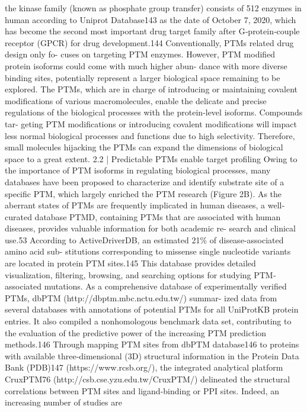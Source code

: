 the kinase family (known as phosphate group transfer) consists of 512 enzymes in human according to Uniprot
Database143 as the date of October 7, 2020, which has become the second most important drug target family after
G‐protein‐couple receptor (GPCR) for drug development.144 Conventionally, PTMs related drug design only fo-
cuses on targeting PTM enzymes. However, PTM modified protein isoforms could come with much higher abun-
dance with more diverse binding sites, potentially represent a larger biological space remaining to be explored. The
PTMs, which are in charge of introducing or maintaining covalent modifications of various macromolecules, enable
the delicate and precise regulations of the biological processes with the protein‐level isoforms. Compounds tar-
geting PTM modifications or introducing covalent modifications will impact less normal biological processes and
functions due to high selectivity. Therefore, small molecules hijacking the PTMs can expand the dimensions of
biological space to a great extent.
2.2
|
Predictable PTMs enable target profiling
Owing to the importance of PTM isoforms in regulating biological processes, many databases have been proposed
to characterize and identify substrate site of a specific PTM, which largely enriched the PTM research (Figure 2B).
As the aberrant states of PTMs are frequently implicated in human diseases, a well‐curated database PTMD,
containing PTMs that are associated with human diseases, provides valuable information for both academic re-
search and clinical use.53 According to ActiveDriverDB, an estimated 21\% of disease‐associated amino acid sub-
stitutions corresponding to missense single nucleotide variants are located in protein PTM sites.145 This database
provides detailed visualization, filtering, browsing, and searching options for studying PTM‐associated mutations.
As a comprehensive database of experimentally verified PTMs, dbPTM (http://dbptm.mbc.nctu.edu.tw/) summar-
ized data from several databases with annotations of potential PTMs for all UniProtKB protein entries. It also
compiled a nonhomologous benchmark data set, contributing to the evaluation of the predictive power of the
increasing PTM prediction methods.146 Through mapping PTM sites from dbPTM database146 to proteins with
available three‐dimensional (3D) structural information in the Protein Data Bank (PDB)147 (https://www.rcsb.org/),
the integrated analytical platform CruxPTM76 (http://csb.cse.yzu.edu.tw/CruxPTM/) delineated the structural
correlations between PTM sites and ligand‐binding or PPI sites. Indeed, an increasing number of studies are

